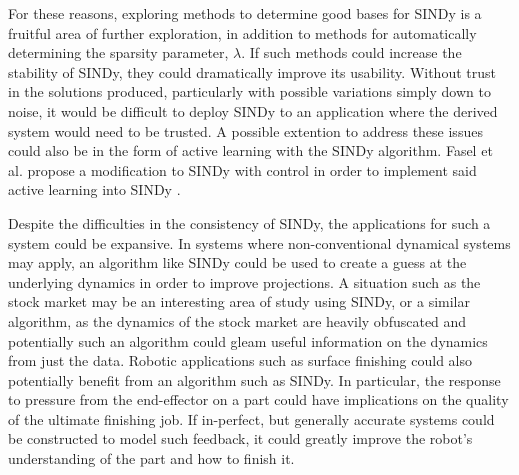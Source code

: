 \documentclass[10pt]{paper}
\begin{document}
For these reasons, exploring methods to determine good bases for SINDy is a fruitful area of further exploration, in addition to methods for automatically determining the sparsity parameter, $\lambda$. %
If such methods could increase the stability of SINDy, they could dramatically improve its usability. Without trust in the solutions produced, particularly with possible variations simply down to noise, it would be difficult to deploy SINDy to an application where the derived system would need to be trusted. 
A possible extention to address these issues could also be in the form of active learning with the SINDy algorithm. Fasel et al. propose a modification to SINDy with control in order to implement said active learning into SINDy \cite{9683120}. 

Despite the difficulties in the consistency of SINDy, the applications for such a system could be expansive. In systems where non-conventional dynamical systems may apply, an algorithm like SINDy could be used to create a guess at the underlying dynamics in order to improve projections. 
A situation such as the stock market may be an interesting area of study using SINDy, or a similar algorithm, as the dynamics of the stock market are heavily obfuscated and potentially such an algorithm could gleam useful information on the dynamics from just the data. 
Robotic applications such as surface finishing could also potentially benefit from an algorithm such as SINDy. In particular, the response to pressure from the end-effector on a part could have implications on the quality of the ultimate finishing job. If in-perfect, but generally accurate systems could be constructed to model such feedback, it could greatly improve the robot's understanding of the part and how to finish it. 









\end{document}
